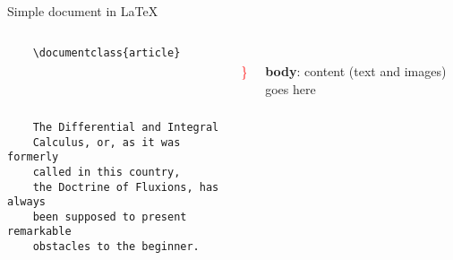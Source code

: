 

\begin{frame}[fragile]{Simple document in \LaTeX}
	\begin{columns}
        \begin{column}{0.5\textwidth}
	\begin{verbatim} 
	\documentclass{article}

		
	

	The Differential and Integral 
	Calculus, or, as it was formerly 
	called in this country, 
	the Doctrine of Fluxions, has always 
	been supposed to present remarkable 
	obstacles to the beginner.

	
	\end{verbatim}
\end{column}
\begin{column}{0.1\textwidth}
	\\[2cm]
	{\Huge \textcolor{red}{ \} } }
\end{column}
\begin{column}{0.3\textwidth}
	\\[2cm]
	\textbf{body}: content (text and images) goes here
\end{column}
\end{columns}

\end{frame}
